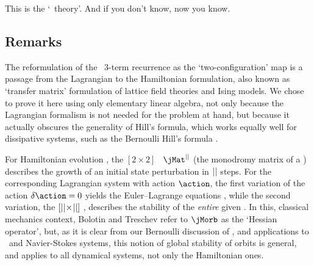 This is the `\po\ theory'. And if you don't know,
 {now you know}.


\subsection{Remarks}
\label{s:LC21HillForm}


The reformulation of the \catlatt\ 3-term recurrence
as the `two-configuration' map
is a passage from the Lagrangian to the Hamiltonian formulation, also
known as `transfer matrix' formulation of lattice field
theories and Ising
models. We chose to prove it here using only
elementary linear algebra, not only because the Lagrangian
formalism is not needed for the problem at hand, but because
it actually obscures the generality of Hill's formula, which works
equally well for dissipative systems, such as the Bernoulli Hill's formula
.

For Hamiltonian evolution , the $[2\!\times\!2]$
\jacobianM\ $\jMat^\cl{}$ (the monodromy matrix of a \po) describes
the growth of an initial state perturbation in ${||}$ steps. For the
corresponding Lagrangian system with action $\action$,
the first variation of
the action $\delta\action=0$ yields the Euler–Lagrange equations
, while the second variation, the
$[{||}\!\times\!{||}]$ {\jacobianOrb} ,
describes the stability of the \emph{entire} given \po. In this,
classical mechanics context, Bolotin and Treschev refer to
$\jMorb$ as the `Hessian operator', but, as it is clear from our
Bernoulli discussion of , and applications to \KS\
and Navier-Stokes systems, this notion of global stability
of orbits is general, and applies to all dynamical systems, not only the
Hamiltonian ones.

